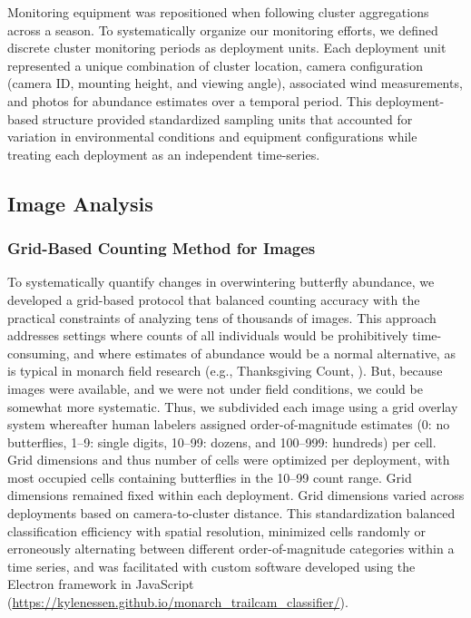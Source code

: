 \documentclass[insects,article,submit,pdftex,moreauthors]{Definitions/mdpi}
\begin{document}
Monitoring equipment was repositioned when following cluster aggregations across a season. To systematically organize our monitoring efforts, we defined discrete cluster monitoring periods as deployment units. Each deployment unit represented a unique combination of cluster location, camera configuration (camera ID, mounting height, and viewing angle), associated wind measurements, and photos for abundance estimates over a temporal period. This deployment-based structure provided standardized sampling units that accounted for variation in environmental conditions and equipment configurations while treating each deployment as an independent time-series.

\subsection{Image Analysis}

\subsubsection{Grid-Based Counting Method for Images}

To systematically quantify changes in overwintering butterfly abundance, we developed a grid-based protocol that balanced counting accuracy with the practical constraints of analyzing tens of thousands of images. This approach addresses settings where counts of all individuals would be prohibitively time-consuming, and where estimates of abundance would be a normal alternative, as is typical in monarch field research (e.g., Thanksgiving Count, \cite{xercessocietyManagingMonarchsWest2018}). But, because images were available, and we were not under field conditions, we could be somewhat more systematic. Thus, we subdivided each image using a grid overlay system whereafter human labelers assigned order-of-magnitude estimates (0: no butterflies, 1--9: single digits, 10--99: dozens, and 100--999: hundreds) per cell. Grid dimensions and thus number of cells were optimized per deployment, with most occupied cells containing butterflies in the 10--99 count range. Grid dimensions remained fixed within each deployment. Grid dimensions varied across deployments based on camera-to-cluster distance. This standardization balanced classification efficiency with spatial resolution, minimized cells randomly or erroneously alternating between different order-of-magnitude categories within a time series, and was facilitated with custom software developed using the Electron framework in JavaScript (\url{https://kylenessen.github.io/monarch_trailcam_classifier/}).
\end{document}
